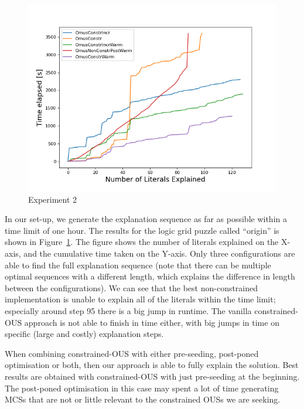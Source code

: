\begin{figure}[t]
    \centering
    \includegraphics[width=\columnwidth]{figures/omusConstrCumulative.png}
    \caption{Experiment 2}
    \label{fig:exp2}
\end{figure}

In our set-up, we generate the explanation sequence as far as possible within a time limit of one hour. 
The results for the logic grid puzzle called ``origin'' is shown in Figure~\ref{fig:exp2}.
The figure shows the number of literals explained on the X-axis, and the cumulative time taken on the Y-axis. 
Only three configurations are able to find the full explanation sequence (note that there can be multiple optimal sequences with a different length, which explains the difference in length between the configurations).
We can see that the best non-constrained implementation is unable to explain all of the literals within the time limit; especially around step 95 there is a big jump in runtime. The vanilla constrained-OUS approach is not able to finish in time either, with big jumps in time on specific (large and costly) explanation steps.

When combining constrained-OUS with either pre-seeding, post-poned optimisation or both, then our approach is able to fully explain the solution. Best results are obtained with constrained-OUS with just pre-seeding at the beginning. The post-poned optimisation in this case may spent a lot of time generating MCSs that are not or little relevant to the constrained OUSs we are seeking. 

